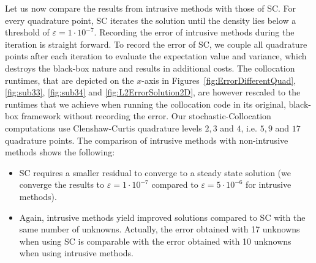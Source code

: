 Let us now compare the results from intrusive methods with those of SC. For every quadrature point, SC iterates the solution until the density lies below a threshold of $\varepsilon = 1\cdot 10^{-7}$. Recording the error of intrusive methods during the iteration is straight forward. To record the error of SC, we couple all quadrature points after each iteration to evaluate the expectation value and variance, which destroys the black-box nature and results in additional costs. The collocation runtimes, that are depicted on the $x$-axis in Figures~\ref{fig:ErrorDifferentQuad}, \ref{fig:sub33}, \ref{fig:sub34} and \ref{fig:L2ErrorSolution2D}, are however rescaled to the runtimes that we achieve when running the collocation code in its original, black-box framework without recording the error. Our stochastic-Collocation computations use Clenshaw-Curtis quadrature levels $2,3$ and $4$, i.e. $5,9$ and $17$ quadrature points. The comparison of intrusive methods with non-intrusive methods shows the following:
\begin{itemize}
\item SC requires a smaller residual to converge to a steady state solution (we converge the results to $\varepsilon = 1\cdot 10^{-7}$ compared to $\varepsilon = 5\cdot 10^{-6}$ for intrusive methods).
\item Again, intrusive methods yield improved solutions compared to SC with the same number of unknowns. Actually, the error obtained with 17 unknowns when using SC is comparable with the error obtained with 10 unknowns when using intrusive methods.
\end{itemize}

